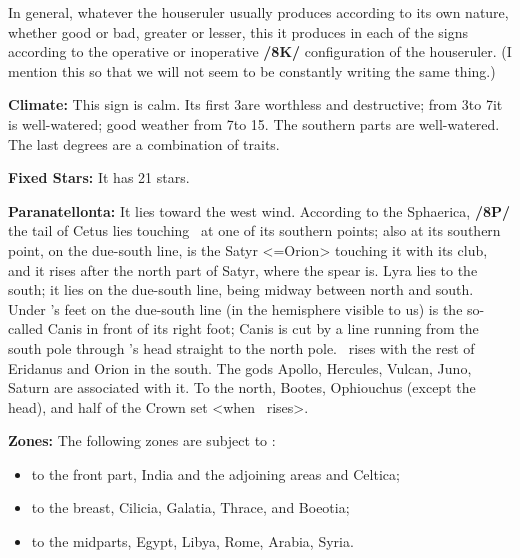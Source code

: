 \mndl[0.2cm]
In general, whatever the houseruler usually produces according to its own nature, whether good or bad, greater or lesser, this it produces in each of the signs according to the operative or inoperative \textbf{/8K/} configuration of the houseruler. (I mention this so that we will not seem to be constantly writing the same thing.)

\textbf{Climate:} This sign is calm. Its first 3\deg are worthless and destructive; from 3\deg to 7\deg it is well-watered; good weather from 7\deg to 15\deg. The southern parts are well-watered. The last degrees are a combination of traits.

\textbf{Fixed Stars:} It has 21 stars. 

\textbf{Paranatellonta:} It lies toward the west wind. According to the Sphaerica, \textbf{/8P/} the tail of Cetus lies touching \Gemini\, at one of its southern points; also at its southern point, on the due-south line, is the Satyr <=Orion> touching it with its club, and it rises after the north part of Satyr, where the spear is. Lyra lies to the south; it lies on the due-south line, being midway between north and south. Under \Gemini’s feet on the due-south line (in the hemisphere visible to us) is the so-called Canis in front of its right foot; Canis is cut by a line running from the south pole through \Gemini's head straight to the north pole. 
\Gemini\, rises with the rest of Eridanus and Orion in the south. The gods Apollo, Hercules, Vulcan, Juno, Saturn are associated with it. To the north, Bootes, Ophiouchus (except the head), and half of the Crown set <when \Gemini\, rises>. 

\textbf{Zones:} The following zones are subject to \Gemini: 
\begin{itemize}
\item to the front part, India and the adjoining areas and Celtica; 
\item to the breast, Cilicia, Galatia, Thrace, and Boeotia; 
\item to the midparts, Egypt, Libya, Rome, Arabia, Syria.
\end{itemize}

